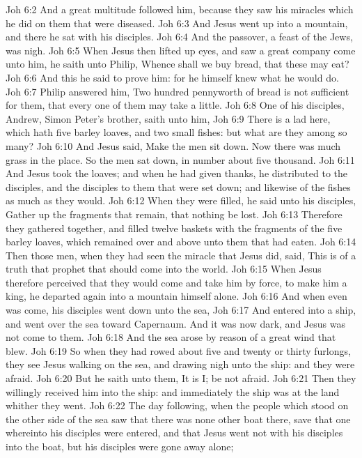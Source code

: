 \vs Joh 6:2 And a great multitude followed him, because they saw his miracles which he did on them that were diseased.
\vs Joh 6:3 And Jesus went up into a mountain, and there he sat with his disciples.
\vs Joh 6:4 And the passover, a feast of the Jews, was nigh.
\vs Joh 6:5 When Jesus then lifted up  eyes, and saw a great company come unto him, he saith unto Philip, Whence shall we buy bread, that these may eat?
\vs Joh 6:6 And this he said to prove him: for he himself knew what he would do.
\vs Joh 6:7 Philip answered him, Two hundred pennyworth of bread is not sufficient for them, that every one of them may take a little.
\vs Joh 6:8 One of his disciples, Andrew, Simon Peter's brother, saith unto him,
\vs Joh 6:9 There is a lad here, which hath five barley loaves, and two small fishes: but what are they among so many?
\vs Joh 6:10 And Jesus said, Make the men sit down. Now there was much grass in the place. So the men sat down, in number about five thousand.
\vs Joh 6:11 And Jesus took the loaves; and when he had given thanks, he distributed to the disciples, and the disciples to them that were set down; and likewise of the fishes as much as they would.
\vs Joh 6:12 When they were filled, he said unto his disciples, Gather up the fragments that remain, that nothing be lost.
\vs Joh 6:13 Therefore they gathered  together, and filled twelve baskets with the fragments of the five barley loaves, which remained over and above unto them that had eaten.
\vs Joh 6:14 Then those men, when they had seen the miracle that Jesus did, said, This is of a truth that prophet that should come into the world.
\vs Joh 6:15 When Jesus therefore perceived that they would come and take him by force, to make him a king, he departed again into a mountain himself alone.
\vs Joh 6:16 And when even was  come, his disciples went down unto the sea,
\vs Joh 6:17 And entered into a ship, and went over the sea toward Capernaum. And it was now dark, and Jesus was not come to them.
\vs Joh 6:18 And the sea arose by reason of a great wind that blew.
\vs Joh 6:19 So when they had rowed about five and twenty or thirty furlongs, they see Jesus walking on the sea, and drawing nigh unto the ship: and they were afraid.
\vs Joh 6:20 But he saith unto them, It is I; be not afraid.
\vs Joh 6:21 Then they willingly received him into the ship: and immediately the ship was at the land whither they went.
\vs Joh 6:22 The day following, when the people which stood on the other side of the sea saw that there was none other boat there, save that one whereinto his disciples were entered, and that Jesus went not with his disciples into the boat, but  his disciples were gone away alone;
